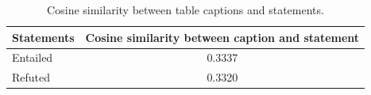 \begin{table}[ht]
\center
\begin{tabular}{lc}
\hline
Statements & Cosine similarity between caption and statement\\
\hline
Entailed  & 0.3337\\
Refuted & 0.3320\\
\hline
\end{tabular}
\caption{Cosine similarity between table captions and statements.}
\label{tab:tabfact_caption_cosine_sim}
\end{table}